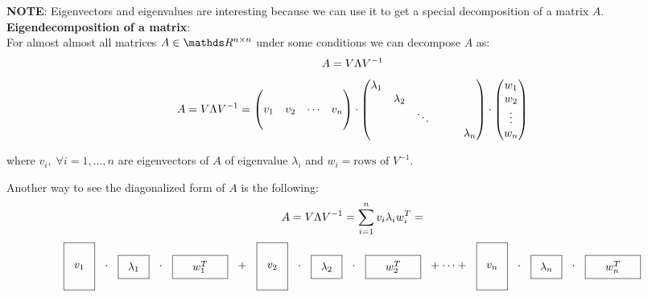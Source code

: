 \documentclass[computationalMathematics.tex]{subfiles}
\begin{document}
\noindent \textbf{NOTE}: Eigenvectors and eigenvalues are interesting because we can use it to get a special decomposition of a matrix $A$.\\

\noindent \textbf{Eigendecomposition of a matrix}:\\
For almost almost all matrices $A \in \R^{n \times n}$ under some conditions we can decompose $A$ as:
 $$A = V \Lambda {V}^{-1}$$
\[
  A = V \Lambda {V}^{-1} = \begin{pmatrix}
    \\
    v_1 & v_2 & \cdots & v_n\\
    \\
  \end{pmatrix}
  \cdot 
  \begin{pmatrix}
    \lambda_1\\
    &\lambda_2\\
    && \ddots\\
    &&&&&\lambda_n\\
  \end{pmatrix}
  \cdot 
  \begin{pmatrix}
    w_1\\
    w_2\\
    \vdots\\
    w_n\\
  \end{pmatrix}
\]

where $v_i, \; \forall i=1, \ldots, n$ are eigenvectors of $A$ of eigenvalue $\lambda_i$ and $w_i = \text{rows of } V^{-1}$.\\

Another way to see the diagonalized form of $A$ is the following:
$$ A = V \Lambda {V}^{-1} = \sum\limits_{i=1}^{n} v_i\lambda_i w_i^T = $$
$$    \tallthin{$v_1$} \cdot \real{$\lambda_1$} \cdot \shortlarge{$w_1^T$} + \tallthin{$v_2$} \cdot \real{$\lambda_2$} \cdot \shortlarge{$w_2^T$} + \cdots + \tallthin{$v_n$} \cdot \real{$\lambda_n$} \cdot \shortlarge{$w_n^T$}
$$
\end{document}
